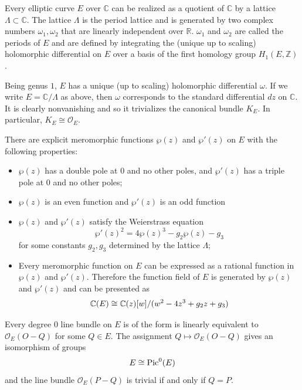 \documentclass[12pt]{article}
\begin{document}
\begin{proposition}
    Every elliptic curve $E$ over $\mathbb{C}$ can be realized as a quotient of $\mathbb{C}$ by a lattice $\Lambda \subset \mathbb{C}$. The lattice $\Lambda$ is the period lattice and is generated by two complex numbers $\omega_1, \omega_2$ that are linearly independent over $\mathbb{R}$. $\omega_1$ and $\omega_2$ are called the periods of $E$ and are defined by integrating the (unique up to scaling) holomorphic differential on $E$ over a basis of the first homology group $H_1(E, \mathbb{Z})$.
\end{proposition}

\begin{proposition}
    Being genus $1$, $E$ has a unique (up to scaling) holomorphic differential $\omega$. If we write $E = \mathbb{C}/\Lambda$ as above, then $\omega$ corresponds to the standard differential $dz$ on $\mathbb{C}$. It is clearly nonvanishing and so it trivializes the canonical bundle $K_E$. In particular, $K_E \cong \mathcal{O}_E$.
\end{proposition}

\begin{proposition}
    There are explicit meromorphic functions $\wp(z)$ and $\wp'(z)$ on $E$ with the following properties:
    \begin{itemize}
        \item $\wp(z)$ has a double pole at $0$ and no other poles, and $\wp'(z)$ has a triple pole at $0$ and no other poles;
        \item $\wp(z)$ is an even function and $\wp'(z)$ is an odd function
        \item $\wp(z)$ and $\wp'(z)$ satisfy the Weierstrass equation
              \[\wp'(z)^2 = 4\wp(z)^3 - g_2 \wp(z) - g_3\]
              for some constants $g_2, g_3$ determined by the lattice $\Lambda$;
        \item Every meromorphic function on $E$ can be expressed as a rational function in $\wp(z)$ and $\wp'(z)$. Therefore the function field of $E$ is generated by $\wp(z)$ and $\wp'(z)$ and can be presented as
              \begin{align*}
                  \mathbb{C}(E)\cong \mathbb{C}(z)[w]/(w^2 - 4z^3 + g_2 z + g_3)
              \end{align*}
    \end{itemize}
\end{proposition}

\begin{proposition}
    Every degree $0$ line bundle on $E$ is of the form is linearly equivalent to $\mathcal O_E(O - Q)$ for some $Q \in E$. The assignment $Q \mapsto \mathcal O_E(O - Q)$ gives an isomorphism of groups
    \[E \cong \operatorname{Pic}^0(E)
    \] and the line bundle $\mathcal O_E(P-Q)$ is trivial if and only if $Q=P$.
\end{proposition}
\end{document}
